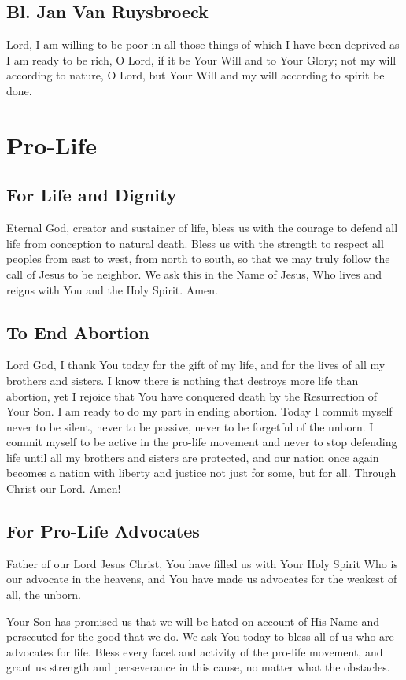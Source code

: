 \documentclass[12pt]{article}
\newcommand{\prayersection}[1]{\section{#1}}
\newcommand{\prayertitle}[1]{\subsection{#1}}
\begin{document}
\prayertitle{Bl. Jan Van Ruysbroeck}
Lord, I am willing to be poor in all those things of which I have been deprived as I am ready to be rich, O Lord, if it be Your Will and to Your Glory;
not my will according to nature, O Lord, but Your Will and my will according to spirit be done.

\newpage

\prayersection{Pro-Life}
\prayertitle{For Life and Dignity}
Eternal God, creator and sustainer of life, bless us with the courage to defend all life from conception to natural death.
Bless us with the strength to respect all peoples from east to west, from north to south,
so that we may truly follow the call of Jesus to be neighbor.
We ask this in the Name of Jesus, Who lives and reigns with You and the Holy Spirit.
Amen.

\prayertitle{To End Abortion}
Lord God, I thank You today for the gift of my life, and for the lives of all my brothers and sisters.
I know there is nothing that destroys more life than abortion, yet I rejoice that You have conquered death by the Resurrection of Your Son. 
I am ready to do my part in ending abortion. Today I commit myself 
never to be silent, 
never to be passive, 
never to be forgetful of the unborn. 
I commit myself to be active in the pro-life movement and never to stop defending life until all my brothers and sisters are protected, and our nation once again becomes a nation with liberty and justice not just for some, but for all.
Through Christ our Lord. Amen!

\prayertitle{For Pro-Life Advocates}
Father of our Lord Jesus Christ,
You have filled us with Your Holy Spirit Who is our advocate in the heavens, and You have made us advocates for the weakest of all, the unborn.

Your Son has promised us that we will be hated on account of His Name and persecuted for the good that we do.
We ask You today to bless all of us who are advocates for life.
Bless every facet and activity of the pro-life movement, and grant us strength and perseverance in this cause, no matter what the obstacles.
\end{document}

